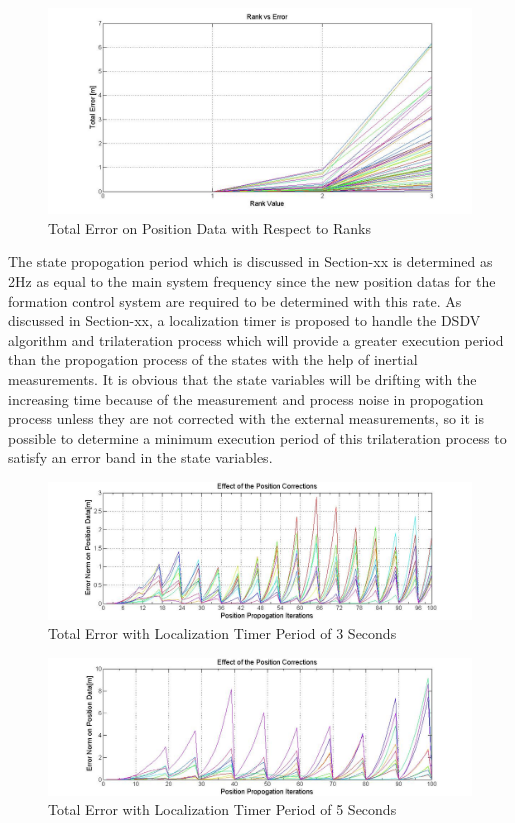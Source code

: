 \documentclass[twoside]{article}
\begin{document}
			\begin{figure}[H]
				\caption{Total Error on Position Data with Respect to Ranks}
				\centerline{\includegraphics[scale = 0.4]{Rank_vs_Error}}
		\end{figure} 
	
The state propogation period which is discussed in Section-xx is determined as 2Hz as equal to the main system frequency since the new position datas for the formation control system are required to be determined with this rate. 	As discussed in Section-xx, a localization timer is proposed to handle the DSDV algorithm and trilateration process which will provide a greater execution period than the propogation process of the states with the help of inertial measurements. It is obvious that the state variables will be drifting with the increasing time because of the measurement and process noise in propogation process unless they are not corrected with the external measurements, so it is possible to determine a minimum execution period of this trilateration process to satisfy an error band in the state variables. 
		
		
		\begin{figure}[H]
			\caption{Total Error with Localization Timer Period of 3 Seconds}
			\centerline{\includegraphics[scale = 0.4]{Error-0,5Prop-3Update}}
		\end{figure} 
		
				\begin{figure}[H]
					\caption{Total Error with Localization Timer Period of 5 Seconds}
					\centerline{\includegraphics[scale = 0.4]{Error-0,5Prop-5Update}}
				\end{figure} 
\end{document}
